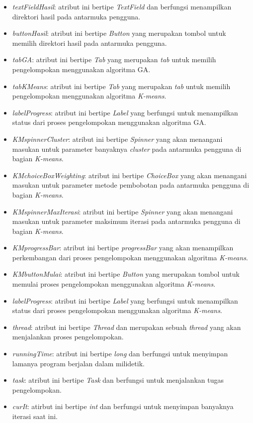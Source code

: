 \begin{itemize}
	\item \textit{textFieldHasil}: atribut ini bertipe \textit{TextField} dan berfungsi menampilkan direktori hasil pada antarmuka pengguna.
	\item \textit{buttonHasil}: atribut ini bertipe \textit{Button} yang merupakan tombol untuk memilih direktori hasil pada antarmuka pengguna.
	\item \textit{tabGA}: atribut ini bertipe \textit{Tab} yang merupakan \textit{tab} untuk memilih pengelompokan menggunakan algoritma GA.
	\item \textit{tabKMeans}: atribut ini bertipe \textit{Tab} yang merupakan \textit{tab} untuk memilih pengelompokan menggunakan algoritma \textit{K-means}.
	\item \textit{labelProgress}: atribut ini bertipe \textit{Label} yang berfungsi untuk menampilkan status dari proses pengelompokan menggunakan algoritma GA.
	\item \textit{KMspinnerCluster}: atribut ini bertipe \textit{Spinner} yang akan menangani masukan untuk parameter banyaknya \textit{cluster} pada antarmuka pengguna di bagian \textit{K-means}.
	\item \textit{KMchoiceBoxWeighting}: atribut ini bertipe \textit{ChoiceBox} yang akan menangani masukan untuk parameter metode pembobotan pada antarmuka pengguna di bagian \textit{K-means}.
	\item \textit{KMspinnerMaxIterasi}: atribut ini bertipe \textit{Spinner} yang akan menangani masukan untuk parameter maksimum iterasi pada antarmuka pengguna di bagian \textit{K-means}.
	\item \textit{KMprogressBar}: atribut ini bertipe \textit{progressBar} yang akan menampilkan perkembangan dari proses pengelompokan menggunakan algoritma \textit{K-means}.
	\item \textit{KMbuttonMulai}: atribut ini bertipe \textit{Button} yang merupakan tombol untuk memulai proses pengelompokan menggunakan algoritma \textit{K-means}.
	\item \textit{labelProgress}: atribut ini bertipe \textit{Label} yang berfungsi untuk menampilkan status dari proses pengelompokan menggunakan algoritma \textit{K-means}.
	\item \textit{thread}: atribut ini bertipe \textit{Thread} dan merupakan sebuah \textit{thread} yang akan menjalankan proses pengelompokan.
	\item \textit{runningTime}: atribut ini bertipe \textit{long} dan berfungsi untuk menyimpan lamanya program berjalan dalam milidetik.
	\item \textit{task}: atribut ini bertipe \textit{Task} dan berfungsi untuk menjalankan tugas pengelompokan.
	\item \textit{curIt}: atirbut ini bertipe \textit{int} dan berfungsi untuk menyimpan banyaknya iterasi saat ini.
\end{itemize}

